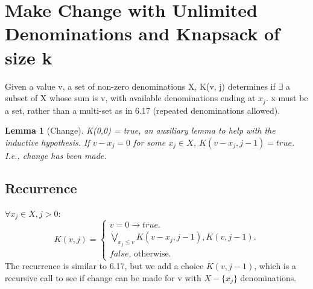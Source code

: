 \documentclass{article}
\newtheorem{lemma}[theorem]{Lemma}
\begin{document}
	
\section{Make Change with Unlimited Denominations and Knapsack of size k}
Given a value v, a set of non-zero denominations X, K(v, j) determines if $\exists$ a subset of X whose sum is v, with available denominations ending at $x_j$. x must be a set, rather than a multi-set as in 6.17 (repeated denominations allowed).

\begin{lemma} [Change]
\label{bc1}	
K(0,0) = true, an auxiliary lemma to help with the inductive hypothesis.
If $v - x_j = 0$ for some $x_j \in X$, $K(v-x_j, j-1) = true$. I.e., change has been made.
\end{lemma}

\subsection{Recurrence}
$\forall x_j \in X, j>0$:\\
\begin{equation}
K(v,j)=			
\begin{cases}
v = 0 \to true.\\	
\underset{x_j \leq v}{\bigvee} K(v-x_j, j-1), K(v, j-1).\\
false \text{, otherwise.}
\end{cases}
\end{equation}
The recurrence is similar to 6.17, but we add a choice $K(v,j-1)$, which is a recursive call to see if change can be made for v with $X - \{x_j\}$ denominations.
\end{document}
